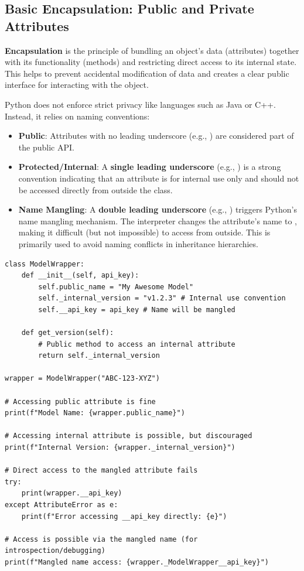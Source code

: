 \subsection{Basic Encapsulation: Public and Private Attributes}
\label{subsec:encapsulation}
\textbf{Encapsulation} is the principle of bundling an object's data (attributes) together with its functionality (methods) and restricting direct access to its internal state. This helps to prevent accidental modification of data and creates a clear public interface for interacting with the object.

Python does not enforce strict privacy like languages such as Java or C++. Instead, it relies on naming conventions:
\begin{itemize}
    \item \textbf{Public}: Attributes with no leading underscore (e.g., ) are considered part of the public API.
    \item \textbf{Protected/Internal}: A \textbf{single leading underscore} (e.g., ) is a strong convention indicating that an attribute is for internal use only and should not be accessed directly from outside the class.
    \item \textbf{Name Mangling}: A \textbf{double leading underscore} (e.g., ) triggers Python's name mangling mechanism. The interpreter changes the attribute's name to , making it difficult (but not impossible) to access from outside. This is primarily used to avoid naming conflicts in inheritance hierarchies.
\end{itemize}

\begin{example}
\text{ }\begin{verbatim}
class ModelWrapper:
    def __init__(self, api_key):
        self.public_name = "My Awesome Model"
        self._internal_version = "v1.2.3" # Internal use convention
        self.__api_key = api_key # Name will be mangled

    def get_version(self):
        # Public method to access an internal attribute
        return self._internal_version

wrapper = ModelWrapper("ABC-123-XYZ")

# Accessing public attribute is fine
print(f"Model Name: {wrapper.public_name}")

# Accessing internal attribute is possible, but discouraged
print(f"Internal Version: {wrapper._internal_version}")

# Direct access to the mangled attribute fails
try:
    print(wrapper.__api_key)
except AttributeError as e:
    print(f"Error accessing __api_key directly: {e}")

# Access is possible via the mangled name (for introspection/debugging)
print(f"Mangled name access: {wrapper._ModelWrapper__api_key}")
\end{verbatim}
\end{example}


